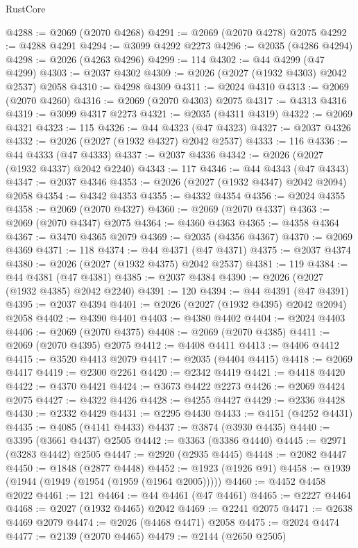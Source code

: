 \begin{lexlean}{RustCore}
\begin{coremodule}
@4288 := @2069 (@2070 @4268)
@4291 := @2069 (@2070 @4278) @2075
@4292 := @4288 @4291
@4294 := @3099 @4292 @2273
@4296 := @2035 (@4286 @4294)
@4298 := @2026 (@4263 @4296)
@4299 := 114
@4302 := @44 @4299 (@47 @4299)
@4303 := @2037 @4302
@4309 := @2026 (@2027 (@1932 @4303) @2042 @2537) @2058
@4310 := @4298 @4309
@4311 := @2024 @4310
@4313 := @2069 (@2070 @4260)
@4316 := @2069 (@2070 @4303) @2075
@4317 := @4313 @4316
@4319 := @3099 @4317 @2273
@4321 := @2035 (@4311 @4319)
@4322 := @2069 @4321
@4323 := 115
@4326 := @44 @4323 (@47 @4323)
@4327 := @2037 @4326
@4332 := @2026 (@2027 (@1932 @4327) @2042 @2537)
@4333 := 116
@4336 := @44 @4333 (@47 @4333)
@4337 := @2037 @4336
@4342 := @2026 (@2027 (@1932 @4337) @2042 @2240)
@4343 := 117
@4346 := @44 @4343 (@47 @4343)
@4347 := @2037 @4346
@4353 := @2026 (@2027 (@1932 @4347) @2042 @2094) @2058
@4354 := @4342 @4353
@4355 := @4332 @4354
@4356 := @2024 @4355
@4358 := @2069 (@2070 @4327)
@4360 := @2069 (@2070 @4337)
@4363 := @2069 (@2070 @4347) @2075
@4364 := @4360 @4363
@4365 := @4358 @4364
@4367 := @3470 @4365 @2079
@4369 := @2035 (@4356 @4367)
@4370 := @2069 @4369
@4371 := 118
@4374 := @44 @4371 (@47 @4371)
@4375 := @2037 @4374
@4380 := @2026 (@2027 (@1932 @4375) @2042 @2537)
@4381 := 119
@4384 := @44 @4381 (@47 @4381)
@4385 := @2037 @4384
@4390 := @2026 (@2027 (@1932 @4385) @2042 @2240)
@4391 := 120
@4394 := @44 @4391 (@47 @4391)
@4395 := @2037 @4394
@4401 := @2026 (@2027 (@1932 @4395) @2042 @2094) @2058
@4402 := @4390 @4401
@4403 := @4380 @4402
@4404 := @2024 @4403
@4406 := @2069 (@2070 @4375)
@4408 := @2069 (@2070 @4385)
@4411 := @2069 (@2070 @4395) @2075
@4412 := @4408 @4411
@4413 := @4406 @4412
@4415 := @3520 @4413 @2079
@4417 := @2035 (@4404 @4415)
@4418 := @2069 @4417
@4419 := @2300 @2261
@4420 := @2342 @4419
@4421 := @4418 @4420
@4422 := @4370 @4421
@4424 := @3673 @4422 @2273
@4426 := @2069 @4424 @2075
@4427 := @4322 @4426
@4428 := @4255 @4427
@4429 := @2336 @4428
@4430 := @2332 @4429
@4431 := @2295 @4430
@4433 := @4151 (@4252 @4431)
@4435 := @4085 (@4141 @4433)
@4437 := @3874 (@3930 @4435)
@4440 := @3395 (@3661 @4437) @2505
@4442 := @3363 (@3386 @4440)
@4445 := @2971 (@3283 @4442) @2505
@4447 := @2920 (@2935 @4445)
@4448 := @2082 @4447
@4450 := @1848 (@2877 @4448)
@4452 := @1923 (@1926 @91)
@4458 := @1939 (@1944 (@1949 (@1954 (@1959 (@1964 @2005)))))
@4460 := @4452 @4458 @2022
@4461 := 121
@4464 := @44 @4461 (@47 @4461)
@4465 := @2227 @4464
@4468 := @2027 (@1932 @4465) @2042
@4469 := @2241 @2075
@4471 := @2638 @4469 @2079
@4474 := @2026 (@4468 @4471) @2058
@4475 := @2024 @4474
@4477 := @2139 (@2070 @4465)
@4479 := @2144 (@2650 @2505)

\end{coremodule}
\end{lexlean}
